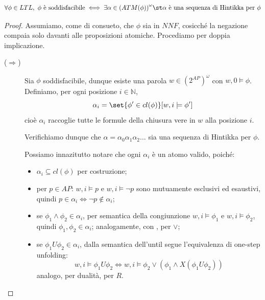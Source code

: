 \begin{theorem}{}
  \[\forall \phi \in LTL,\ \phi \text{ è soddisfacibile} \iff \exists \alpha \in {(ATM(\phi))}^\omega \st \alpha \text{ è una sequenza di Hintikka per } \phi\]
\end{theorem}
\begin{proof}
  Assumiamo, come di consueto, che \(\phi\) sia in \(NNF\), cosicché la negazione compaia solo davanti alle proposizioni atomiche. Procediamo per doppia implicazione.
  \begin{description}
    \item[(\(\Rightarrow\))] Sia \(\phi\) soddisfacibile, dunque esiste una parola \(w \in {(2^{AP})}^\omega\) con \(w,0 \models \phi\).
      Definiamo, per ogni posizione \(i \in \mathbb{N}\),
      \[
        \alpha_i = \set{\phi' \in cl(\phi)}[ w,i \models \phi']
      \]
      cioè \(\alpha_i\) raccoglie tutte le formule della chiusura vere in \(w\) alla posizione \(i\).

      Verifichiamo dunque che \(\alpha = \alpha_0\alpha_1\alpha_2\ldots\) sia una sequenza di Hintikka per \(\phi\).

      Possiamo innazitutto notare che ogni \(\alpha_i\) è un atomo valido, poiché:
        \begin{itemize}
        \item \(\alpha_i \subseteq cl(\phi)\) per costruzione;
        \item per \(p \in AP\): \(w,i\models p\) e \(w,i\models\neg p\) sono mutuamente esclusivi ed esaustivi, quindi \(p \in \alpha_i \iff \neg p \notin \alpha_i\);
        \item se \(\phi_1\land\phi_2 \in \alpha_i\), per semantica della congiunzione \(w,i\models\phi_1\) e \(w,i\models\phi_2\), quindi \(\phi_1,\phi_2\in\alpha_i\); analogamente, con , per \(\lor\);
        \item se \(\phi_1 U \phi_2 \in \alpha_i\), dalla semantica dell'until segue l'equivalenza di one-step unfolding:
        \[
          w,i \models \phi_1 U \phi_2 \iff w,i \models \phi_2 \lor (\phi_1 \land X(\phi_1 U \phi_2))
        \]
        analogo, per dualità, per \(R\).
      \end{itemize}


\end{description}
\end{proof}
